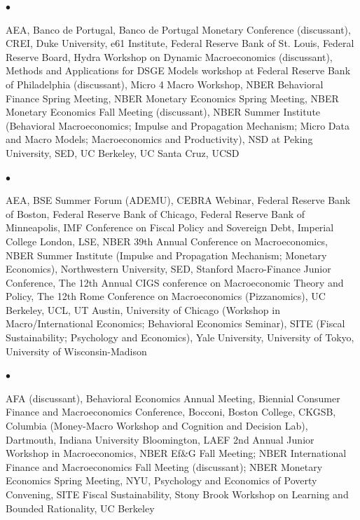 \documentclass[line]{res}
\newenvironment{list1}{
  \begin{list}{\ding{113}}{%
      \setlength{\itemsep}{0.07in}
      \setlength{\parsep}{0in} \setlength{\parskip}{0in}
		\setlength{\topsep}{0.07in} \setlength{\partopsep}{0in}
      \setlength{\leftmargin}{0.0in}}}{\end{list}}
\newenvironment{list2}{
  \begin{list}{$\bullet$}{%
      \setlength{\itemsep}{0in}
      \setlength{\parsep}{0in} \setlength{\parskip}{0in}
      \setlength{\topsep}{0in} \setlength{\partopsep}{0in} 
      \setlength{\leftmargin}{0in}}}{\end{list}}
\begin{document}
\begin{resume}
\begin{list1}
\item[2025]
\begin{list2}
\item[] AEA, Banco de Portugal, Banco de Portugal Monetary Conference (discussant), CREI, Duke University, e61 Institute, Federal Reserve Bank of St. Louis, Federal Reserve Board, Hydra Workshop on Dynamic Macroeconomics (discussant), Methods and Applications for DSGE Models workshop at Federal Reserve Bank of Philadelphia (discussant), Micro 4 Macro Workshop, NBER Behavioral Finance Spring Meeting, NBER Monetary Economics Spring Meeting, NBER Monetary Economics Fall Meeting (discussant), NBER Summer Institute (Behavioral Macroeconomics; Impulse and Propagation Mechanism; Micro Data and Macro Models; Macroeconomics and Productivity), NSD at Peking University, SED, UC Berkeley, UC Santa Cruz, UCSD 
\end{list2}

\item[2024]
\begin{list2}
\item[] AEA, BSE Summer Forum (ADEMU), CEBRA Webinar, Federal Reserve Bank of Boston, Federal Reserve Bank of Chicago, Federal Reserve Bank of Minneapolis, IMF Conference on Fiscal Policy and Sovereign Debt, Imperial College London, LSE, NBER 39th Annual Conference on Macroeconomics, NBER Summer Institute (Impulse and Propagation Mechanism; Monetary Economics), Northwestern University, SED, Stanford Macro-Finance Junior Conference, The 12th Annual CIGS conference on Macroeconomic Theory and Policy, The 12th Rome Conference on Macroeconomics (Pizzanomics), UC Berkeley, UCL, UT Austin, University of Chicago (Workshop in Macro/International Economics; Behavioral Economics Seminar), SITE (Fiscal Sustainability; Psychology and Economics), Yale University, University of Tokyo, University of Wisconsin-Madison
\end{list2}

\item[2023]
\begin{list2}
\item[] AFA (discussant), Behavioral Economics Annual Meeting, Biennial Consumer Finance and Macroeconomics Conference, Bocconi, Boston College, CKGSB, Columbia (Money-Macro Workshop and Cognition and Decision Lab), Dartmouth, Indiana University Bloomington, LAEF 2nd Annual Junior Workshop in Macroeconomics, NBER Ef\&G Fall Meeting; NBER International Finance and Macroeconomics Fall Meeting (discussant); NBER Monetary Economics Spring Meeting, NYU, Psychology and Economics of Poverty Convening, SITE Fiscal Sustainability, Stony Brook Workshop on Learning and Bounded Rationality, UC Berkeley
\end{list2}


\end{list1}
\end{resume}
\end{document}
